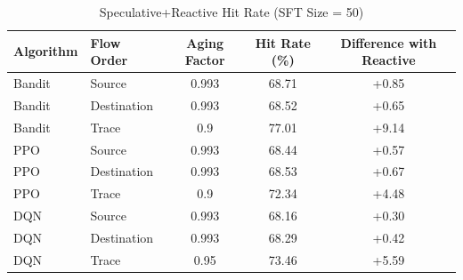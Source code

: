\begin{table}[ht]
\centering
\caption{Speculative+Reactive Hit Rate (SFT Size = 50)}
\label{tab:speculativereactive-hitrate-50}
\begin{tabular}{llccc}
\toprule
Algorithm & Flow Order & Aging Factor & Hit Rate (\%) & Difference with Reactive \\
\midrule
Bandit & Source & 0.993 & 68.71 & +0.85 \\
Bandit & Destination & 0.993 & 68.52 & +0.65 \\
Bandit & Trace & 0.9 & 77.01 & +9.14 \\
PPO & Source & 0.993 & 68.44 & +0.57 \\
PPO & Destination & 0.993 & 68.53 & +0.67 \\
PPO & Trace & 0.9 & 72.34 & +4.48 \\
DQN & Source & 0.993 & 68.16 & +0.30 \\
DQN & Destination & 0.993 & 68.29 & +0.42 \\
DQN & Trace & 0.95 & 73.46 & +5.59 \\
\bottomrule
\end{tabular}
\end{table}
